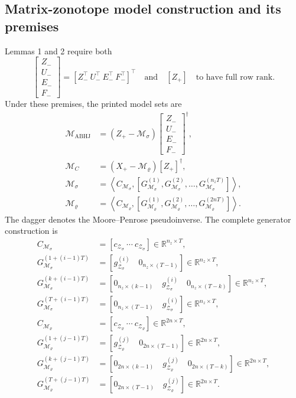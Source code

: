 \documentclass{article}
\begin{document}
\subsection*{Matrix-zonotope model construction and its premises}
Lemmas 1 and 2 require both
\[
\begin{bmatrix}Z_-\\U_-\\E_-\\F_-\end{bmatrix}
=\left[Z_-^\top\ U_-^\top\ E_-^\top\ F_-^\top\right]^\top
\quad\text{and}\quad [Z_+]
\quad\text{to have full row rank}.
\]
Under these premises, the printed model sets are
\begin{align}
\mathcal{M}_{\mathrm{ABHJ}}&=(Z_+-\mathcal{M}_{\sigma})\begin{bmatrix}Z_-\\U_-\\E_-\\F_-\end{bmatrix}^{\dagger}, \tag{39}\\
\mathcal{M}_C&=(X_+-\mathcal{M}_{\varrho})[Z_+]^{\dagger}, \tag{40}\\
\mathcal{M}_{\sigma}&=\left\langle C_{\mathcal{M}_{\sigma}},[G_{\mathcal{M}_{\sigma}}^{(1)},G_{\mathcal{M}_{\sigma}}^{(2)},\ldots,G_{\mathcal{M}_{\sigma}}^{(n_zT)}]\right\rangle, \tag{41}\\
\mathcal{M}_{\varrho}&=\left\langle C_{\mathcal{M}_{\varrho}},[G_{\mathcal{M}_{\varrho}}^{(1)},G_{\mathcal{M}_{\varrho}}^{(2)},\ldots,G_{\mathcal{M}_{\varrho}}^{(2nT)}]\right\rangle. \tag{42}
\end{align}
The dagger denotes the Moore--Penrose pseudoinverse. The complete generator construction is
\begin{align}
C_{\mathcal{M}_{\sigma}}&=[c_{\mathcal{Z}_{\sigma}}\ \cdots\ c_{\mathcal{Z}_{\sigma}}]\in\mathbb{R}^{n_z\times T}, \tag{43a}\\
G_{\mathcal{M}_{\sigma}}^{(1+(i-1)T)}&=[g_{\mathcal{Z}_{\sigma}}^{(i)}\quad 0_{n_z\times(T-1)}]\in\mathbb{R}^{n_z\times T}, \tag{43b}\\
G_{\mathcal{M}_{\sigma}}^{(k+(i-1)T)}&=[0_{n_z\times(k-1)}\quad g_{\mathcal{Z}_{\sigma}}^{(i)}\quad0_{n_z\times(T-k)}]\in\mathbb{R}^{n_z\times T}, \tag{43c}\\
G_{\mathcal{M}_{\sigma}}^{(T+(i-1)T)}&=[0_{n_z\times(T-1)}\quad g_{\mathcal{Z}_{\sigma}}^{(i)}]\in\mathbb{R}^{n_z\times T}, \tag{43d}\\
C_{\mathcal{M}_{\varrho}}&=[c_{\mathcal{Z}_{\varrho}}\ \cdots\ c_{\mathcal{Z}_{\varrho}}]\in\mathbb{R}^{2n\times T}, \tag{44a}\\
G_{\mathcal{M}_{\varrho}}^{(1+(j-1)T)}&=[g_{\mathcal{Z}_{\varrho}}^{(j)}\quad0_{2n\times(T-1)}]\in\mathbb{R}^{2n\times T}, \tag{44b}\\
G_{\mathcal{M}_{\varrho}}^{(k+(j-1)T)}&=[0_{2n\times(k-1)}\quad g_{\mathcal{Z}_{\varrho}}^{(j)}\quad0_{2n\times(T-k)}]\in\mathbb{R}^{2n\times T}, \tag{44c}\\
G_{\mathcal{M}_{\varrho}}^{(T+(j-1)T)}&=[0_{2n\times(T-1)}\quad g_{\mathcal{Z}_{\varrho}}^{(j)}]\in\mathbb{R}^{2n\times T}. \tag{44d}
\end{align}
\end{document}
